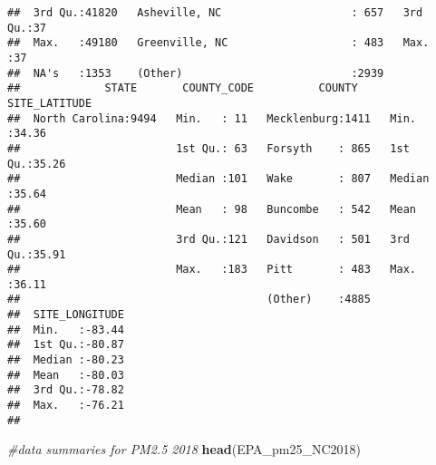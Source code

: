 \documentclass[]{article}
\newenvironment{Shaded}{\begin{snugshade}}{\end{snugshade}}
\newcommand{\KeywordTok}[1]{\textcolor[rgb]{0.13,0.29,0.53}{\textbf{#1}}}
\newcommand{\CommentTok}[1]{\textcolor[rgb]{0.56,0.35,0.01}{\textit{#1}}}
\newcommand{\NormalTok}[1]{#1}
\begin{document}
\begin{verbatim}
##  3rd Qu.:41820   Asheville, NC                    : 657   3rd Qu.:37  
##  Max.   :49180   Greenville, NC                   : 483   Max.   :37  
##  NA's   :1353    (Other)                          :2939               
##             STATE       COUNTY_CODE          COUNTY     SITE_LATITUDE  
##  North Carolina:9494   Min.   : 11   Mecklenburg:1411   Min.   :34.36  
##                        1st Qu.: 63   Forsyth    : 865   1st Qu.:35.26  
##                        Median :101   Wake       : 807   Median :35.64  
##                        Mean   : 98   Buncombe   : 542   Mean   :35.60  
##                        3rd Qu.:121   Davidson   : 501   3rd Qu.:35.91  
##                        Max.   :183   Pitt       : 483   Max.   :36.11  
##                                      (Other)    :4885                  
##  SITE_LONGITUDE  
##  Min.   :-83.44  
##  1st Qu.:-80.87  
##  Median :-80.23  
##  Mean   :-80.03  
##  3rd Qu.:-78.82  
##  Max.   :-76.21  
## 
\end{verbatim}

\begin{Shaded}
\begin{Highlighting}[]
\CommentTok{#data summaries for PM2.5 2018}
\KeywordTok{head}\NormalTok{(EPA_pm25_NC2018)}
\end{Highlighting}
\end{Shaded}
\end{document}

